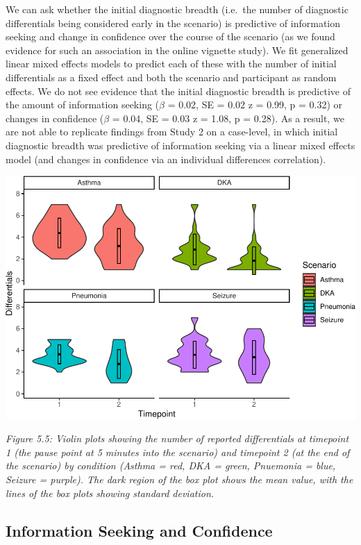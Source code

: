 \documentclass[a4paper, nobind]{templates/ociamthesis}
\begin{document}
\hfill\break
We can ask whether the initial diagnostic breadth (i.e.~the number of diagnostic differentials being considered early in the scenario) is predictive of information seeking and change in confidence over the course of the scenario (as we found evidence for such an association in the online vignette study). We fit generalized linear mixed effects models to predict each of these with the number of initial differentials as a fixed effect and both the scenario and participant as random effects. We do not see evidence that the initial diagnostic breadth is predictive of the amount of information seeking (\(\beta\) = 0.02, SE = 0.02 z = 0.99, p = 0.32) or changes in confidence (\(\beta\) = 0.04, SE = 0.03 z = 1.08, p = 0.28). As a result, we are not able to replicate findings from Study 2 on a case-level, in which initial diagnostic breadth was predictive of information seeking via a linear mixed effects model (and changes in confidence via an individual differences correlation).

\begin{center}\includegraphics[width=1\linewidth]{_main_files/figure-latex/diagtime-1} \end{center}

\emph{Figure 5.5: Violin plots showing the number of reported differentials at timepoint 1 (the pause point at 5 minutes into the scenario) and timepoint 2 (at the end of the scenario) by condition (Asthma = red, DKA = green, Pnuemonia = blue, Seizure = purple). The dark region of the box plot shows the mean value, with the lines of the box plots showing standard deviation.}

\subsection*{Information Seeking and Confidence}\label{information-seeking-and-confidence}
\end{document}
